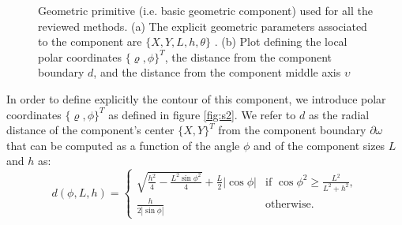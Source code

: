 \begin{figure}[!ht]
\caption{Geometric primitive (i.e. basic geometric component) used for all the reviewed methods. (a) The explicit geometric parameters associated to the component are $\lbrace X,Y,L,h,\theta \rbrace$ . (b)  Plot defining the local polar coordinates  $\lbrace \varrho,\phi \rbrace^T$, the distance from the component boundary $d$, and the distance from the component middle axis $\upsilon$  } 
\end{figure}
In order to define explicitly the contour of this component, we introduce polar coordinates $\lbrace \varrho,\phi \rbrace^T$ as defined in figure \ref{fig:s2}.
We refer to $d$ as the radial distance of the component's center $\{X,Y\}^T$ from the component boundary $\partial \omega$ that can be computed as a function of the angle $\phi$ and of the component sizes $L$ and $h$ as:
\begin{equation}
    d(\phi,L,h) = \begin{cases}
              \sqrt{\frac{h^2}{4}-\frac{L^2\sin{\phi}^2}{4}}+\frac{L}{2}|\cos{\phi}| & \text{if } \cos{\phi}^2\geq \frac{L^2}{L^2+h^2},\\
               \frac{h}{2|\sin{\phi}|} & \text{otherwise}.
          \end{cases}
\end{equation}
